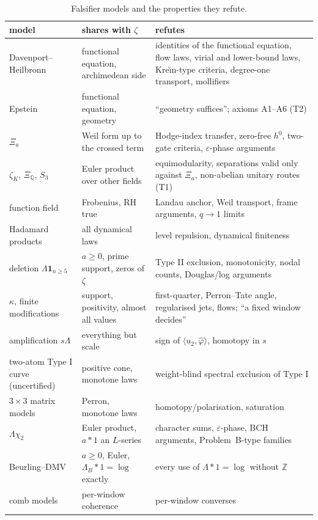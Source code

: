 \documentclass[11pt]{amsart}
\theoremstyle{definition}
\theoremstyle{remark}
\newcommand{\Z}{\mathbb Z}
\newcommand{\Q}{\mathbb Q}
\begin{document}
\begin{table}[ht]
\centering\small
\caption{Falsifier models and the properties they refute.}\label{tab:falsifiers}
\begin{tabularx}{\textwidth}{@{}p{3.3cm}p{4.0cm}Y@{}}
\toprule
model & shares with $\zeta$ & refutes \\
\midrule
Davenport--Heilbronn & functional equation, archimedean side & identities of the functional equation, flow laws, virial and lower-bound laws, Kre\u{\i}n-type criteria, degree-one transport, mollifiers \\
Epstein & functional equation, geometry & ``geometry suffices''; axioms A1--A6 (T2) \\
$\Xi_a$ & Weil form up to the crossed term & Hodge-index transfer, zero-free $h^0$, two-gate criteria, $\varepsilon$-phase arguments \\
$\zeta_K$, $\Xi_\Q$, $S_3$ & Euler product over other fields & equimodularity, separations valid only against $\Xi_a$, non-abelian unitary routes (T1) \\
function field & Frobenius, RH true & Landau anchor, Weil transport, frame arguments, $q\to1$ limits \\
Hadamard products & all dynamical laws & level repulsion, dynamical finiteness \\
deletion $\Lambda\mathbf1_{n\ge5}$ & $a\ge0$, prime support, zeros of $\zeta$ & Type II exclusion, monotonicity, nodal counts, Douglas/log arguments \\
$\kappa$, finite modifications & support, positivity, almost all values & first-quarter, Perron--Tate angle, regularised jets, flows; ``a fixed window decides'' \\
amplification $s\Lambda$ & everything but scale & sign of $\langle u_2,\hat\varphi\rangle$, homotopy in $s$ \\
two-atom Type I curve (uncertified) & positive cone, monotone laws & weight-blind spectral exclusion of Type I \\
$3\times3$ matrix models & Perron, monotone laws & homotopy/polarisation, saturation \\
$\Lambda\chi_2$ & Euler product, $a*1$ an $L$-series & character sums, $\varepsilon$-phase, BCH arguments, Problem~B-type families \\
Beurling--DMV & $a\ge0$, Euler, $\Lambda_B*1=\log$ exactly & every use of $\Lambda*1=\log$ without $\Z$ \\
comb models & per-window coherence & per-window converses \\

\end{tabularx}
\end{table}
\end{document}
